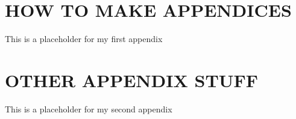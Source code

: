 \documentclass[12pt]{article}
\begin{document}



\appendix

\makeatletter
\def\@seccntformat#1{APPENDIX \csname the#1\endcsname.~}
\makeatother

\section{HOW TO MAKE APPENDICES}
\label{app::a}

This is a placeholder for my first appendix

\section{OTHER APPENDIX STUFF}
\label{app::b}

This is a placeholder for my second appendix
\end{document}
